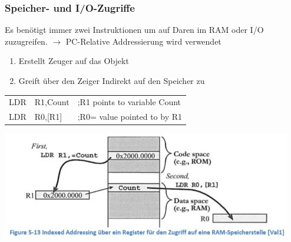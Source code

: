 \subsubsection{Speicher- und I/O-Zugriffe}
\begin{multicols}{2}
    \begin{minipage}{\linewidth}
    Es benötigt immer zwei Instruktionen um auf Daren im RAM oder I/O zuzugreifen.
    $\rightarrow$ PC-Relative Addressierung wird verwendet
    \begin{enumerate}
        \item Erstellt Zeuger auf das Objekt
        \item Greift über den Zeiger Indirekt auf den Speicher zu
    \end{enumerate}
    \begin{tabular}{lll}
        LDR   &R1,Count   &;R1 points to variable Count\\ 
        LDR   &R0,[R1]    &;R0= value pointed to by R1\\ 
    \end{tabular} 
\end{minipage}

    \includegraphics[width=\linewidth]{images/AddressingRAM}   
\end{multicols}





















